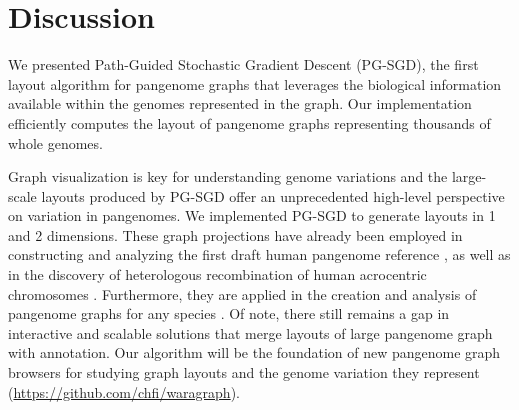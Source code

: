 \documentclass{bioinfo}
\theoremstyle{definition}
\begin{document}

	\section{Discussion}
	\label{sec:discussion}
	
	We presented Path-Guided Stochastic Gradient Descent (PG-SGD), the first layout algorithm for pangenome graphs that leverages the biological information available within the genomes represented in the graph.
	Our implementation efficiently computes the layout of pangenome graphs representing thousands of whole genomes.
	
	Graph visualization is key for understanding genome variations and the large-scale layouts produced by PG-SGD offer an unprecedented high-level perspective on variation in pangenomes.
	We implemented PG-SGD to generate layouts in 1 and 2 dimensions.
	These graph projections have already been employed in constructing and analyzing the first draft human pangenome reference \citep{Liao2023}, as well as in the discovery of heterologous recombination of human acrocentric chromosomes \citep{Guarracino2023}.
	Furthermore, they are applied in the creation and analysis of pangenome graphs for any species \citep{Guarracino2022, Garrison2023}.
	Of note, there still remains a gap in interactive and scalable solutions that merge layouts of large pangenome graph with annotation.
	Our algorithm will be the foundation of new pangenome graph browsers for studying graph layouts and the genome variation they represent (\url{https://github.com/chfi/waragraph}).
	
\end{document}
